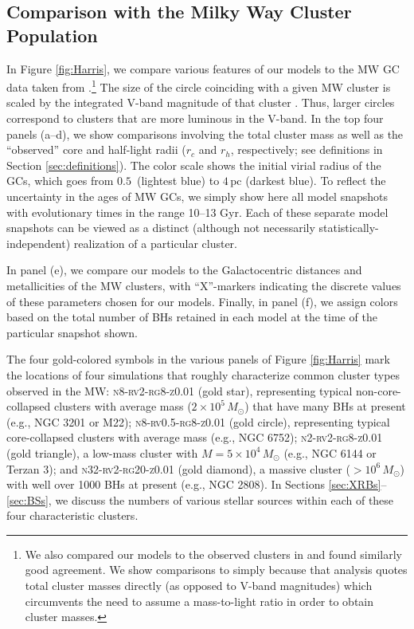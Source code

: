 \documentclass[twocolumn,tighten]{aastex63}
\begin{document}
\subsection{Comparison with the Milky Way Cluster Population}
\label{sec:comparison_to_MW}

In Figure \ref{fig:Harris}, we compare various features of our models to the MW GC data taken from \citet{Baumgardt2018}.\footnote{We also compared our models to the observed clusters in \citet{Harris1996} and found similarly good agreement. We show comparisons to \citet{Baumgardt2018} simply because that analysis quotes total cluster masses directly (as opposed to V-band magnitudes) which circumvents the need to assume a mass-to-light ratio in order to obtain cluster masses.} The size of the circle coinciding with a given MW cluster is scaled by the integrated V-band magnitude of that cluster \citep[taken from][]{Harris1996}. Thus, larger circles correspond to clusters that are more luminous in the V-band. In the top four panels (a--d), we show comparisons involving the total cluster mass as well as the ``observed'' core and half-light radii ($r_c$ and $r_h$, respectively; see definitions in Section \ref{sec:definitions}).
The color scale shows the initial virial radius of the GCs, which goes from $0.5\,$ (lightest blue) to $4\,$pc (darkest blue). To reflect the uncertainty in the ages of MW GCs, we simply show here all model snapshots with evolutionary times in the range 10--13 Gyr. Each of these separate model snapshots can be viewed as a distinct (although not necessarily statistically-independent) realization of a particular cluster.

In panel (e), we compare our models to the Galactocentric distances and metallicities of the MW clusters, with ``X''-markers indicating the discrete values of these parameters chosen for our models. Finally, in panel (f), we assign colors based on the total number of BHs retained in each model at the time of the particular snapshot shown.

The four gold-colored symbols in the various panels of Figure \ref{fig:Harris} mark the locations of four simulations that roughly characterize common cluster types observed in the MW: \textsc{n8-rv2-rg8-z0.01} (gold star), representing typical non-core-collapsed clusters with average mass ($2\times10^5\,M_{\odot}$) that have many BHs at present (e.g., NGC 3201 or M22); \textsc{n8-rv0.5-rg8-z0.01} (gold circle), representing typical core-collapsed clusters with average mass (e.g., NGC 6752); \textsc{n2-rv2-rg8-z0.01} (gold triangle), a low-mass cluster with $M=5\times10^4\,M_{\odot}$ (e.g., NGC 6144 or Terzan 3); and \textsc{n32-rv2-rg20-z0.01} (gold diamond), a massive cluster ($>10^6\,M_{\odot}$) with well over 1000 BHs at present (e.g., NGC 2808). In Sections \ref{sec:XRBs}--\ref{sec:BSs}, we discuss the numbers of various stellar sources within each of these four characteristic clusters.
\end{document}
